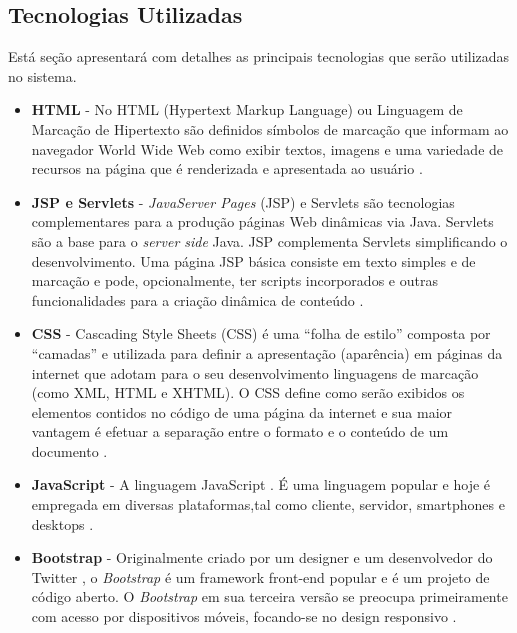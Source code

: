 \documentclass[a4paper,12pt]{monografia}
\begin{document}
\subsection{Tecnologias Utilizadas} %
\label{sub:tecnologias_ultilizadas}

Está seção apresentará com detalhes as principais tecnologias que serão utilizadas no sistema.

\begin{itemize}
\item \textbf{HTML} - No HTML (Hypertext Markup Language) ou Linguagem de Marcação de Hipertexto são definidos símbolos de marcação que informam ao navegador World Wide Web como exibir textos, imagens e uma variedade de recursos na página que é renderizada e apresentada ao usuário \cite{html}.

\item \textbf{JSP e Servlets} - \textit{JavaServer Pages} (JSP) e Servlets são tecnologias complementares para a produção páginas Web dinâmicas via Java. Servlets são a base para o \textit{server side} Java. JSP complementa Servlets  simplificando o desenvolvimento. Uma página JSP básica consiste em texto simples e de marcação e pode, opcionalmente, ter scripts incorporados e outras funcionalidades para a criação dinâmica de conteúdo \cite{jsp2007java}.

\item \textbf{CSS} - Cascading Style Sheets (CSS) é uma “folha de estilo” composta por “camadas” e utilizada para definir a apresentação (aparência) em páginas da internet que adotam para o seu desenvolvimento linguagens de marcação (como XML, HTML e XHTML). O CSS define como serão exibidos os elementos contidos no código de uma página da internet e sua maior vantagem é efetuar a separação entre o formato e o conteúdo de um documento \cite{anapereira}.

\item \textbf{JavaScript} - A linguagem JavaScript \cite{goodman}. É uma linguagem popular e hoje é empregada em diversas plataformas,tal como cliente, servidor, smartphones e desktops \cite{stefanov}.

\item \textbf{Bootstrap} - Originalmente criado por um designer e um desenvolvedor do Twitter \citeyear{twitter}, o \textit{Bootstrap} é um framework front-end popular e é um projeto de código aberto. O \textit{Bootstrap} em sua terceira versão se preocupa primeiramente com acesso por dispositivos móveis, focando-se no design responsivo \cite{bootstrap}.


\end{itemize}
\end{document}
